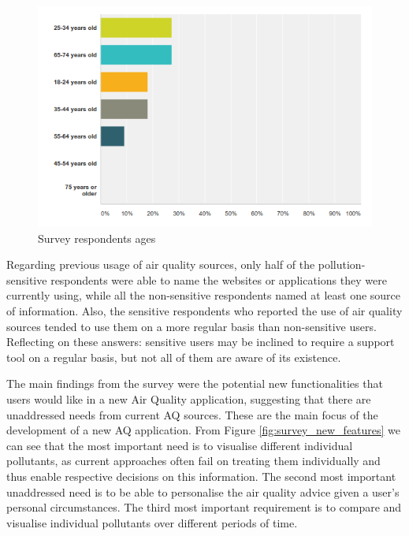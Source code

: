 \begin{figure}[H]
\begin{adjustbox}{width=1\textwidth,center=\textwidth}
  \centering
  \includegraphics[scale=1]{images/ages_survey.png}
\end{adjustbox}
  \caption[Survey respondents ages ]{Survey respondents ages}
  \label{fig:survey_ages}
\end{figure}

Regarding previous usage of air quality sources, only half of the pollution-sensitive respondents were able to name the websites or applications they were currently using, while all the non-sensitive respondents named at least one source of information. Also, the sensitive respondents who reported the use of air quality sources tended to use them on a more regular basis than non-sensitive users. Reflecting on these answers: sensitive users may be inclined to require a support tool on a regular basis, but not all of them are aware of its existence.

The main findings from the survey were the potential new functionalities that users would like in a new Air Quality application, suggesting that there are unaddressed needs from current AQ sources. These are the main focus of the development of a new AQ application. From Figure \ref{fig:survey_new_features} we can see that the most important need is to visualise different individual pollutants, as current approaches often fail on treating them individually and thus enable respective decisions on this information. The second most important unaddressed need is to be able to personalise the air quality advice given a user's personal circumstances. The third most important requirement is to compare and visualise individual pollutants over different periods of time. 

